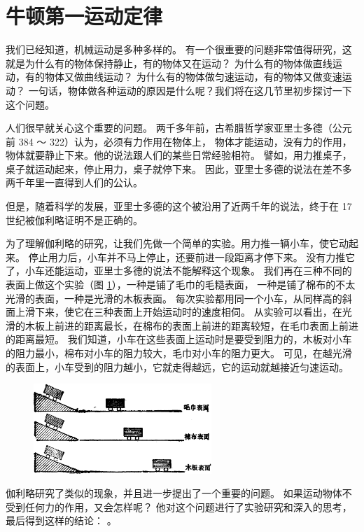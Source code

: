 \section{牛顿第一运动定律}\label{sec:3-6}

我们已经知道，机械运动是多种多样的。
有一个很重要的问题非常值得研究，这就是为什么有的物体保持静止，有的物体又在运动？
为什么有的物体做直线运动，有的物体又做曲线运动？
为什么有的物体做匀速运动，有的物体又做变速运动？
一句话，物体做各种运动的原因是什么呢？我们将在这几节里初步探讨一下这个问题。

人们很早就关心这个重要的问题。
两千多年前，古希腊哲学家亚里士多德（公元前 384 ～ 322）认为，必须有力作用在物体上，
物体才能运动，没有力的作用，物体就要静止下来。他的说法跟人们的某些日常经验相符。
譬如，用力推桌子，桌子就运动起来，停止用力，桌子就停下来。
因此，亚里士多德的说法在差不多两千年里一直得到人们的公认。

但是，随着科学的发展，亚里士多德的这个被沿用了近两千年的说法，终于在 17 世纪被伽利略证明不是正确的。

为了理解伽利略的研究，让我们先做一个简单的实验。用力推一辆小车，使它动起来。
停止用力后，小车并不马上停止，还要前进一段距离才停下来。
没有力推它了，小车还能运动，亚里士多德的说法不能解释这个现象。
我们再在三种不同的表面上做这个实验（图 \ref{fig:3-5}），一种是铺了毛巾的毛糙表面，
一种是铺了棉布的不太光滑的表面，一种是光滑的木板表面。
每次实验都用同一个小车，从同样高的斜面上滑下来，使它在三种表面上开始运动时的速度相伺。
从实验可以看出，在光滑的木板上前进的距离最长，在棉布的表面上前进的距离较短，在毛巾表面上前进的距离最短。
我们知道，小车在这些表面上运动时是要受到阻力的，木板对小车的阻力最小，棉布对小车的阻力较大，毛巾对小车的阻力更大。
可见，在越光滑的表面上，小车受到的阻力越小，它就走得越远，它的运动就越接近匀速运动。

\begin{figure}[htbp]
    \centering
    \includegraphics[width=0.6\textwidth]{../pic/czwl1-ch3-5}
    \caption{}\label{fig:3-5}
\end{figure}

伽利略研究了类似的现象，并且进一步提出了一个重要的问题。
如果运动物体不受到任何力的作用，又会怎样呢？
他对这个问题进行了实验研究和深入的思考，最后得到这样的结论：
。

